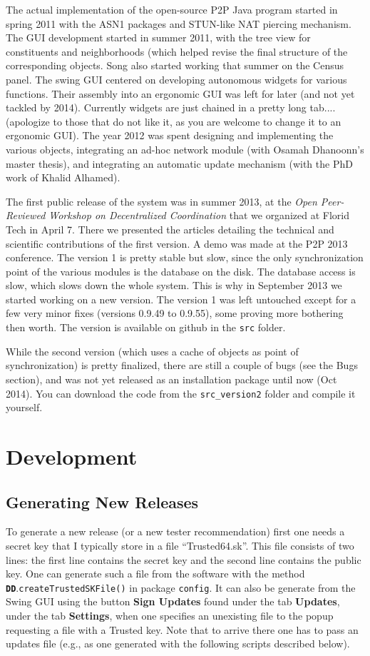\documentclass{book}
\newcommand{\pkg}[1]{{\tt #1}}
\newcommand{\cls}[1]{{\tt\bf #1}}
\newcommand{\mth}[1]{{\tt #1}}
\begin{document}
The actual implementation of the open-source P2P Java program started in spring 2011 with the ASN1 packages and STUN-like NAT piercing mechanism.  The GUI development
started in summer 2011, with the tree view for constituents and neighborhoods (which helped revise the final structure of the corresponding objects. Song also started working
that summer on the Census panel. The swing GUI centered on developing autonomous widgets for various functions. Their assembly into an ergonomic GUI was left for
later (and not yet tackled by 2014). Currently widgets are just chained in a pretty long tab.... (apologize to those that do not like it, as you are welcome to change it to an ergonomic GUI).
The year 2012 was spent designing and implementing the various objects, integrating an ad-hoc network module (with Osamah Dhanoonn's master thesis), and integrating an automatic update mechanism
(with the PhD work of Khalid Alhamed).

The first public release of the system was in summer 2013, at the {\em Open Peer-Reviewed Workshop on Decentralized Coordination} that we organized at Florid Tech in April 7. There we presented the articles detailing the technical and scientific contributions of the first version. A demo was made at the P2P 2013 conference. The version 1 is pretty stable but slow, since the only synchronization
point of the various modules is the database on the disk. The database access is slow, which slows down the whole system. This is why in September 2013 we started working on a new version.
The version 1 was left untouched except for a few very minor fixes (versions 0.9.49 to 0.9.55), some proving more bothering then worth. The version is available on github in the {\tt src} folder.

While the second version (which uses a cache of objects as point of synchronization) is pretty finalized, there are still a couple of bugs (see the Bugs section), and was not yet released as an installation package until now (Oct 2014). You can download the code from the {\tt src\_version2} folder and compile it yourself.

\chapter{Development}
\section{Generating New Releases}

To generate a new release (or a new tester recommendation) first one
needs a secret key that I typically store in a file
``Trusted64.sk''. This file consists of two lines: the first line
contains the secret key and the second line contains the public key.
One can generate such a file from the software with the method
\cls{DD}.\mth{createTrustedSKFile()} in package \pkg{config}.  It can
also be generate from the Swing GUI using the button {\bf Sign
  Updates} found under the tab {\bf Updates}, under the tab {\bf
  Settings}, when one specifies an unexisting file to the popup
requesting a file with a Trusted key.  Note that to arrive there one
has to pass an updates file (e.g., as one generated with the following
scripts described below).
\end{document}
